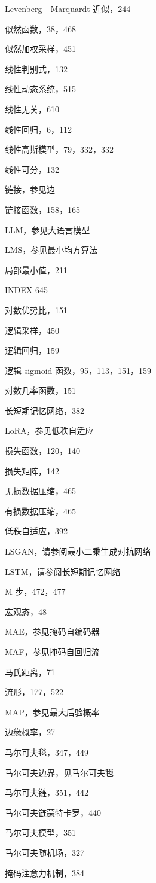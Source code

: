 \documentclass[10pt]{article}
\begin{document}
Levenberg - Marquardt 近似，244

似然函数，38，468

似然加权采样，451

线性判别式，132

线性动态系统，515

线性无关，610

线性回归，6，112

线性高斯模型，79，332，332

线性可分，132

链接，参见边

链接函数，158，165

LLM，参见大语言模型

LMS，参见最小均方算法

局部最小值，211

INDEX 645

对数优势比，151

逻辑采样，450

逻辑回归，159

逻辑 sigmoid 函数，95，113，151，159

对数几率函数，151

长短期记忆网络，382

LoRA，参见低秩自适应

损失函数，120，140

损失矩阵，142

无损数据压缩，465

有损数据压缩，465

低秩自适应，392

LSGAN，请参阅最小二乘生成对抗网络

LSTM，请参阅长短期记忆网络

M 步，472，477

宏观态，48

MAE，参见掩码自编码器

MAF，参见掩码自回归流

马氏距离，71

流形，177，522

MAP，参见最大后验概率

边缘概率，27

马尔可夫毯，347，449

马尔可夫边界，见马尔可夫毯

马尔可夫链，351，442

马尔可夫链蒙特卡罗，440

马尔可夫模型，351

马尔可夫随机场，327

掩码注意力机制，384
\end{document}
